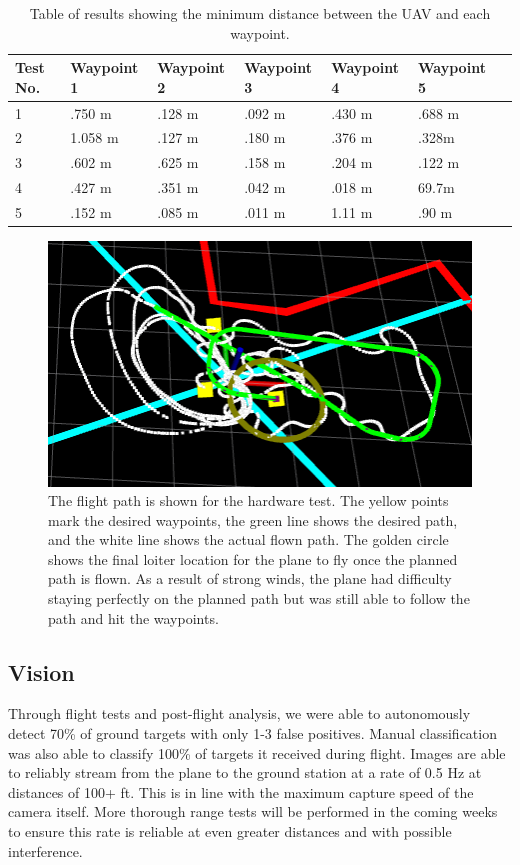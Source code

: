 \documentclass[]{auvsi_doc}
\begin{document}
\begin{table}[h!]

\caption{Table of results showing the minimum distance between the UAV and each waypoint.}
\label{tab:con_res}
\begin{tabular} {|l|l|l|l|l|l|l|}
\hline
Test No. & Waypoint 1&Waypoint 2&Waypoint 3&Waypoint 4&Waypoint 5\\
\hline
1 & .750 m& .128 m& .092 m& .430 m& .688 m \\
2 & 1.058 m &.127 m & .180 m & .376 m & .328m \\
3& .602 m& .625 m&.158 m& .204 m& .122 m\\
4& .427 m & .351 m & .042 m & .018 m& 69.7m\\
5& .152 m& .085 m& .011 m & 1.11 m & .90 m\\
\hline
\end{tabular}
\end{table}

\begin{figure}
    \centering
    \includegraphics[width=.75\textwidth]{WaypointTest.png}
    \caption{The flight path is shown for the hardware test. The yellow points mark the desired waypoints, the green line shows the desired path, and the white line shows the actual flown path. The golden circle shows the final loiter location for the plane to fly once the planned path is flown. As a result of strong winds, the plane had difficulty staying perfectly on the planned path but was still able to follow the path and hit the waypoints.}
    \label{fig:flight}
\end{figure}

\subsection{Vision}

Through flight tests and post-flight analysis, we were able to autonomously detect 70\%
of ground targets with only 1-3 false positives. Manual classification was also able to
classify 100\% of targets it received during flight. Images are able to reliably stream
from the plane to the ground station at a rate of 0.5 Hz at distances of 100+ ft. This
is in line with the maximum capture speed of the camera itself. More thorough range
tests will be performed in the coming weeks to ensure this rate is reliable at even
greater distances and with possible interference.
\end{document}
